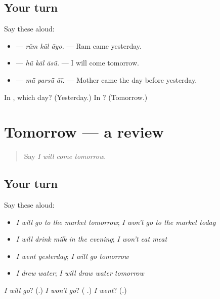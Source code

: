 \subsection*{Your turn}
Say these aloud:

\begin{itemize}
\raggedright
  \item \textbf{  } — \emph{rām kāl āyo.} — Ram came yesterday.
  \item \textbf{  } — \emph{hū̃ kāl āsū̃.} — I will come tomorrow.
  \item \textbf{  } — \emph{mā̃ parsū̃ āī.} — Mother came the day before yesterday.
\end{itemize}

\begin{tcolorbox}[breakable,colback=teal!4,colframe=teal!35!black,title={Before you move on}]
In \textbf{  }, which day? (Yesterday.) In \textbf{  }? (Tomorrow.)
\end{tcolorbox}
\section[(dialogue)]{Tomorrow — a review}

\label{lesson:MW-R162-tomorrow}



\begin{quote}
Say \emph{I will come tomorrow}.
\end{quote}

\subsection*{Your turn}
Say these aloud:

\begin{itemize}
\raggedright
  \item \emph{I will go to the market tomorrow}; \emph{I won't go to the market today}
  \item \emph{I will drink milk in the evening}; \emph{I won't eat meat}
  \item \emph{I went yesterday}; \emph{I will go tomorrow}
  \item \emph{I drew water}; \emph{I will draw water tomorrow}
\end{itemize}

\begin{tcolorbox}[breakable,colback=teal!4,colframe=teal!35!black,title={Before you move on}]
\emph{I will go}? (\textbf{}.) \emph{I won't go}? (\textbf{ }.) \emph{I went}? (\textbf{}.)
\end{tcolorbox}
